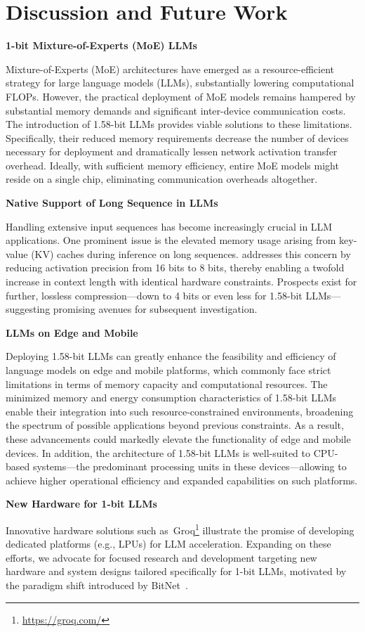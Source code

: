 \section{Discussion and Future Work}

\textbf{1-bit Mixture-of-Experts (MoE) LLMs}

Mixture-of-Experts (MoE) architectures have emerged as a resource-efficient strategy for large language models (LLMs), substantially lowering computational FLOPs. However, the practical deployment of MoE models remains hampered by substantial memory demands and significant inter-device communication costs. The introduction of 1.58-bit LLMs provides viable solutions to these limitations. Specifically, their reduced memory requirements decrease the number of devices necessary for deployment and dramatically lessen network activation transfer overhead. Ideally, with sufficient memory efficiency, entire MoE models might reside on a single chip, eliminating communication overheads altogether.

\textbf{Native Support of Long Sequence in LLMs}

Handling extensive input sequences has become increasingly crucial in LLM applications. One prominent issue is the elevated memory usage arising from key-value (KV) caches during inference on long sequences.  addresses this concern by reducing activation precision from 16 bits to 8 bits, thereby enabling a twofold increase in context length with identical hardware constraints. Prospects exist for further, lossless compression—down to 4 bits or even less for 1.58-bit LLMs—suggesting promising avenues for subsequent investigation.

\textbf{LLMs on Edge and Mobile}

Deploying 1.58-bit LLMs can greatly enhance the feasibility and efficiency of language models on edge and mobile platforms, which commonly face strict limitations in terms of memory capacity and computational resources. The minimized memory and energy consumption characteristics of 1.58-bit LLMs enable their integration into such resource-constrained environments, broadening the spectrum of possible applications beyond previous constraints. As a result, these advancements could markedly elevate the functionality of edge and mobile devices. In addition, the architecture of 1.58-bit LLMs is well-suited to CPU-based systems—the predominant processing units in these devices—allowing  to achieve higher operational efficiency and expanded capabilities on such platforms.

\textbf{New Hardware for 1-bit LLMs}

Innovative hardware solutions such as~Groq\footnote{\url{https://groq.com/}} illustrate the promise of developing dedicated platforms (e.g., LPUs) for LLM acceleration. Expanding on these efforts, we advocate for focused research and development targeting new hardware and system designs tailored specifically for 1-bit LLMs, motivated by the paradigm shift introduced by BitNet~\cite{bitnet}.